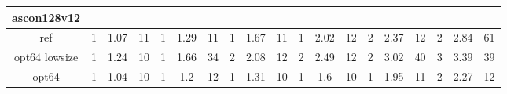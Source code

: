\documentclass[12pt,a4paper,italian]{report}
\begin{document}
\begin{landscape}
\begin{table}[]
\begin{adjustbox}{width=600pt}
\begin{tabular}{|c|c|c|c|c|c|c|c|c|c|c|c|c|c|c|c|c|c|c|}
				\hline
				ascon128v12 & & & & & & & & & & & & & & & & & & \\
				\hline
				ref & 1 & 1.07 & 11 & 1 & 1.29 & 11 & 1 & 1.67 & 11 & 1 & 2.02 & 12 & 2 & 2.37 & 12 & 2 & 2.84 & 61 \\
				\hline
				opt64 lowsize & 1 & 1.24 & 10 & 1 & 1.66 & 34 & 2 & 2.08 & 12 & 2 & 2.49 & 12 & 2 & 3.02 & 40 & 3 & 3.39 & 39 \\
				\hline
				opt64 & 1 & 1.04 & 10 & 1 & 1.2 & 12 & 1 & 1.31 & 10 & 1 & 1.6 & 10 & 1 & 1.95 & 11 & 2 & 2.27 & 12 \\
				\hline
			\end{tabular}
		\end{adjustbox}
	\end{table}
\end{landscape}
\end{document}
